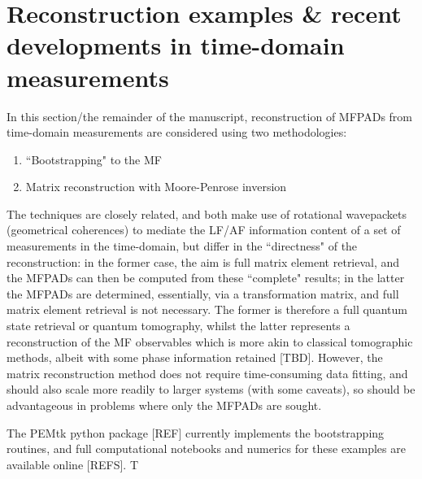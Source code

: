 \section{Reconstruction examples \& recent developments in time-domain measurements}

In this section/the remainder of the manuscript, reconstruction of MFPADs from time-domain measurements are considered using two methodologies:

\begin{enumerate}
\item ``Bootstrapping" to the MF \cite{hockett2018QMP1,hockett2018QMP2,marceau2017MolecularFrameReconstruction}
\item Matrix reconstruction with Moore-Penrose inversion \cite{gregory2021MolecularFramePhotoelectron}
\end{enumerate}

The techniques are closely related, and both make use of rotational wavepackets (geometrical coherences) to mediate the LF/AF information content of a set of measurements in the time-domain, but differ in the ``directness" of the reconstruction: in the former case, the aim is full matrix element retrieval, and the MFPADs can then be computed from these ``complete" results; in the latter the MFPADs are determined, essentially, via a transformation matrix, and full matrix element retrieval is not necessary. The former is therefore a full quantum state retrieval or quantum tomography, whilst the latter represents a reconstruction of the MF observables which is more akin to classical tomographic methods, albeit with some phase information retained [TBD]. However, the matrix reconstruction method does not require time-consuming data fitting, and should also scale more readily to larger systems (with some caveats), so should be advantageous in problems where only the MFPADs are sought.


The PEMtk python package [REF] currently implements the bootstrapping routines, and full computational notebooks and numerics for these examples are available online [REFS]. T